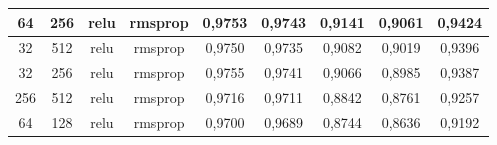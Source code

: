 \begin{table}[H]
{\begin{tabular}{|c|c|c|c|c|c|c|c|c|}
				64                                                                    & 256                                                            & relu                & rmsprop                & 0,9753                                                                 & 0,9743                                                              & 0,9141                                                                            & 0,9061                                                                         & 0,9424                                                               \\ \hline
				32                                                                    & 512                                                            & relu                & rmsprop                & 0,9750                                                                 & 0,9735                                                              & 0,9082                                                                            & 0,9019                                                                         & 0,9396                                                               \\ \hline
				32                                                                    & 256                                                            & relu                & rmsprop                & 0,9755                                                                 & 0,9741                                                              & 0,9066                                                                            & 0,8985                                                                         & 0,9387                                                               \\ \hline
				256                                                                   & 512                                                            & relu                & rmsprop                & 0,9716                                                                 & 0,9711                                                              & 0,8842                                                                            & 0,8761                                                                         & 0,9257                                                               \\ \hline
				64                                                                    & 128                                                            & relu                & rmsprop                & 0,9700                                                                 & 0,9689                                                              & 0,8744                                                                            & 0,8636                                                                         & 0,9192                                                               \\ \hline

\end{tabular}}
\end{table}
